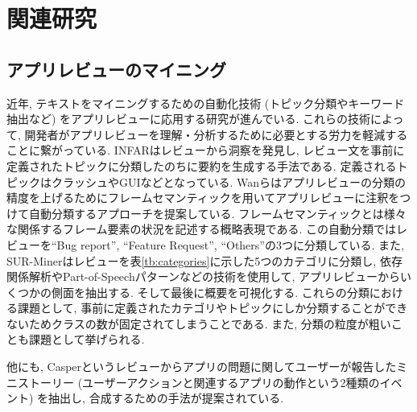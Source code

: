 \chapter{関連研究}
\label{chap:kanrenkenkyuu}





\section{アプリレビューのマイニング}
近年, テキストをマイニングするための自動化技術 (トピック分類やキーワード抽出など)  をアプリレビューに応用する研究が進んでいる. これらの技術によって, 開発者がアプリレビューを理解・分析するために必要とする労力を軽減することに繋がっている. 
INFAR\cite{infar}はレビューから洞察を発見し, レビュー文を事前に定義されたトピックに分類したのちに要約を生成する手法である. 定義されるトピックはクラッシュやGUIなどとなっている. 
Wanら\cite{dsa}はアプリレビューの分類の精度を上げるためにフレームセマンティックを用いてアプリレビューに注釈をつけて自動分類するアプローチを提案している. フレームセマンティックとは様々な関係するフレーム要素の状況を記述する概略表現である. この自動分類ではレビューを``Bug report'', ``Feature Request'', ``Others''の3つに分類している. 
また, SUR-Miner\cite{sur-miner}はレビューを表\ref{tb:categories}に示した5つのカテゴリに分類し, 依存関係解析やPart-of-Speechパターンなどの技術を使用して, アプリレビューからいくつかの側面を抽出する. そして最後に概要を可視化する. 
これらの分類における課題として, 事前に定義されたカテゴリやトピックにしか分類することができないためクラスの数が固定されてしまうことである. また, 分類の粒度が粗いことも課題として挙げられる. 

他にも, Casper\cite{caspar}というレビューからアプリの問題に関してユーザーが報告したミニストーリー (ユーザーアクションと関連するアプリの動作という2種類のイベント)  を抽出し, 合成するための手法が提案されている. 

